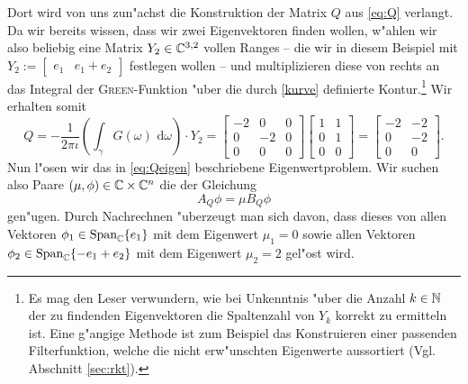 Dort wird von uns zun"achst die Konstruktion der Matrix $Q$ aus \eqref{eq:Q} verlangt.
Da wir bereits wissen, dass wir zwei Eigenvektoren finden wollen, w"ahlen wir also beliebig
eine Matrix $Y_2 \in \mathbb{C}^{3,2}$ vollen Ranges -- die wir in diesem
Beispiel mit $Y_2 := \begin{bmatrix} e_1 & e_1 + e_2 \end{bmatrix}$ festlegen wollen --
und multiplizieren diese von rechts an das Integral der \textsc{Green}-Funktion "uber
die durch \eqref{kurve} definierte Kontur.\footnote{Es mag den Leser verwundern,
wie bei Unkenntnis "uber die Anzahl $k\in\mathbb{N}$ der zu findenden Eigenvektoren die
Spaltenzahl von $Y_k$ korrekt zu ermitteln ist. Eine g"angige Methode ist zum Beispiel das Konstruieren einer
passenden Filterfunktion, welche die nicht erw"unschten Eigenwerte aussortiert (Vgl. Abschnitt \ref{sec:rkt}).}
Wir erhalten somit
\[
Q = -\frac{1}{2\pi\iota}\left(\int_{\gamma}G(\omega)\text{ d}\omega \right)\cdot Y_2
= \begin{bmatrix} -2 & 0&0 \\ 0 & -2& 0\\ 0&0&0\end{bmatrix}
\begin{bmatrix} 1 & 1 \\ 0 & 1\\0&0 \end{bmatrix}
= \begin{bmatrix} -2 & -2 \\ 0 & -2\\0&0 \end{bmatrix}.
\]
Nun l"osen wir das in \eqref{eq:Qeigen} beschriebene
Eigenwertproblem. Wir suchen also Paare $(\mu,\phi) \in \mathbb{C}\times\mathbb{C}^n$ die
der Gleichung
\[
A_Q \phi = \mu B_Q \phi
\]
gen"ugen. Durch Nachrechnen "uberzeugt man sich davon, dass dieses von allen
Vektoren $\phi_1 \in \text{Span}_{\mathbb{C}}\{e_1\}$ mit dem Eigenwert $\mu_1 = 0$ sowie
allen Vektoren $\phi_2 \in \text{Span}_{\mathbb{C}}\{-e_1 + e_2\}$ mit dem Eigenwert
$\mu_2 = 2$ gel"ost wird.\\


